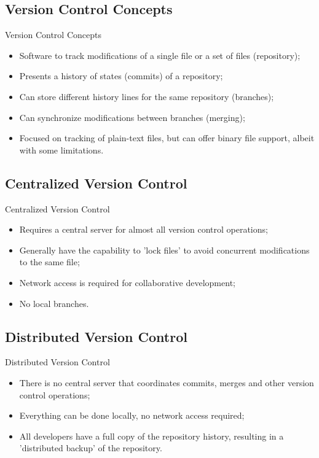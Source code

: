 \documentclass{beamer}
\begin{document}
\subsection{Version Control Concepts}
\begin{frame}{Version Control Concepts}
  \begin{itemize}
    \item Software to track modifications of a single file or a set of files (repository);
    \item Presents a history of states (commits) of a repository;
    \item Can store different history lines for the same repository (branches);
    \item Can synchronize modifications between branches (merging);
    \item Focused on tracking of plain-text files, but can offer binary file support, albeit with some limitations.
  \end{itemize}
\end{frame}

\subsection{Centralized Version Control}
\begin{frame}{Centralized Version Control}
  \begin{itemize}
    \item Requires a central server for almost all version control operations;
    \item Generally have the capability to 'lock files' to avoid concurrent modifications to the same file;
    \item Network access is required for collaborative development;
    \item No local branches.
  \end{itemize}
\end{frame}

\subsection{Distributed Version Control}
\begin{frame}{Distributed Version Control}
  \begin{itemize}
    \item There is no central server that coordinates commits, merges and other version control operations;
    \item Everything can be done locally, no network access required;
    \item All developers have a full copy of the repository history, resulting in a 'distributed backup' of the repository.
  \end{itemize}
\end{frame}
\end{document}
